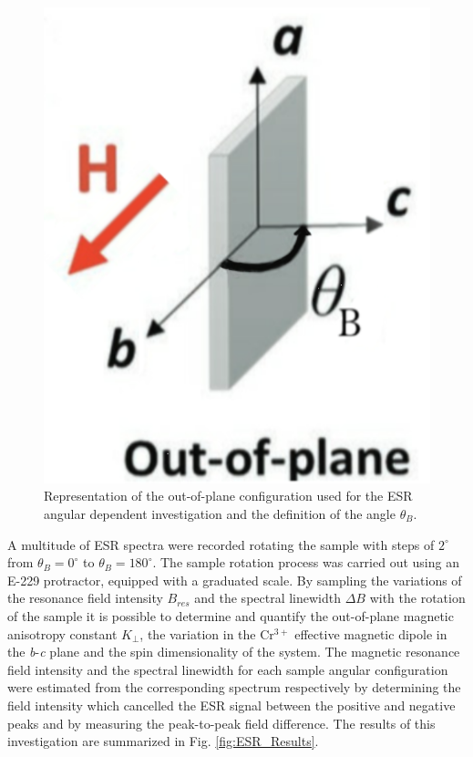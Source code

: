 \documentclass[journal]{IEEEtran}
\begin{document}
\begin{figure}[h!]
    \centering
    \includegraphics[scale=0.25]{out-of-plane.png}
    \caption{Representation of the out-of-plane configuration used for the ESR angular dependent investigation and the definition of the angle $\theta_B$.}
    \label{fig:out-of-plane}
\end{figure}

\noindent A multitude of ESR spectra were recorded rotating the sample with steps of $2^{\circ}$ from $\theta_B=0^{\circ}$ to $\theta_B=180^{\circ}$. The sample rotation process was carried out using an E-229 protractor, equipped with a graduated scale. By sampling the variations of the resonance field intensity $B_{res}$ and the spectral linewidth $\Delta B$ with the rotation of the sample it is possible to determine and quantify the out-of-plane magnetic anisotropy constant $K_{\bot}$, the variation in the Cr$^{3+}$ effective magnetic dipole in the \textit{b}-\textit{c} plane and the spin dimensionality of the system.
The magnetic resonance field intensity and the spectral linewidth for each sample angular configuration were estimated from the corresponding spectrum respectively by determining the field intensity which cancelled the ESR signal between the positive and negative peaks and by measuring the peak-to-peak field difference.
The results of this investigation are summarized in Fig. \ref{fig:ESR_Results}.
\end{document}
